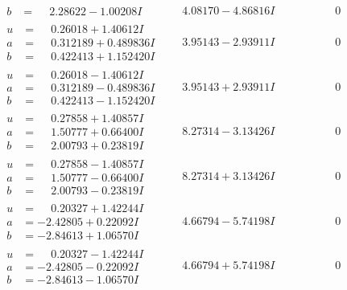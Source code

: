 \documentclass[1p]{elsarticle_modified}
\theoremstyle{definition}
\begin{document}
$$\begin{array}{c|c|c}
\begin{aligned}
b &= \phantom{-}2.28622 - 1.00208 I\end{aligned}
 & \phantom{-}4.08170 - 4.86816 I & \phantom{-0.000000 } 0 \\ \hline\begin{aligned}
u &= \phantom{-}0.26018 + 1.40612 I \\
a &= \phantom{-}0.312189 + 0.489836 I \\
b &= \phantom{-}0.422413 + 1.152420 I\end{aligned}
 & \phantom{-}3.95143 - 2.93911 I & \phantom{-0.000000 } 0 \\ \hline\begin{aligned}
u &= \phantom{-}0.26018 - 1.40612 I \\
a &= \phantom{-}0.312189 - 0.489836 I \\
b &= \phantom{-}0.422413 - 1.152420 I\end{aligned}
 & \phantom{-}3.95143 + 2.93911 I & \phantom{-0.000000 } 0 \\ \hline\begin{aligned}
u &= \phantom{-}0.27858 + 1.40857 I \\
a &= \phantom{-}1.50777 + 0.66400 I \\
b &= \phantom{-}2.00793 + 0.23819 I\end{aligned}
 & \phantom{-}8.27314 - 3.13426 I & \phantom{-0.000000 } 0 \\ \hline\begin{aligned}
u &= \phantom{-}0.27858 - 1.40857 I \\
a &= \phantom{-}1.50777 - 0.66400 I \\
b &= \phantom{-}2.00793 - 0.23819 I\end{aligned}
 & \phantom{-}8.27314 + 3.13426 I & \phantom{-0.000000 } 0 \\ \hline\begin{aligned}
u &= \phantom{-}0.20327 + 1.42244 I \\
a &= -2.42805 + 0.22092 I \\
b &= -2.84613 + 1.06570 I\end{aligned}
 & \phantom{-}4.66794 - 5.74198 I & \phantom{-0.000000 } 0 \\ \hline\begin{aligned}
u &= \phantom{-}0.20327 - 1.42244 I \\
a &= -2.42805 - 0.22092 I \\
b &= -2.84613 - 1.06570 I\end{aligned}
 & \phantom{-}4.66794 + 5.74198 I & \phantom{-0.000000 } 0 \\ \hline\begin{aligned}

\end{aligned}
\end{array}$$
\end{document}
